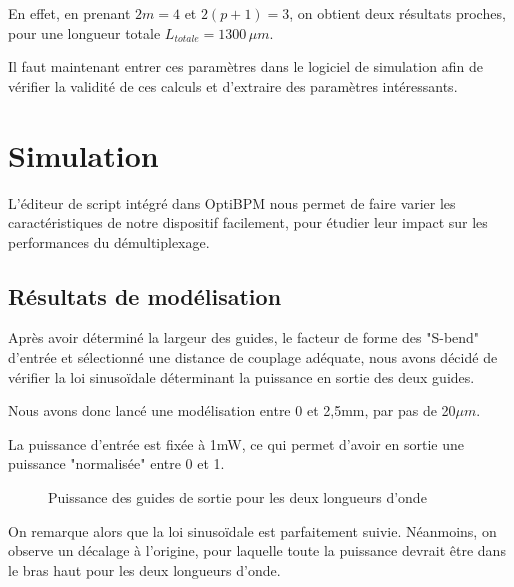 \documentclass[a4paper,11pt]{report}
\begin{document}
En effet, en prenant $2m=4$ et $2(p+1)=3$, on obtient deux résultats proches, pour une longueur totale $L_{totale}=1300\,\mu m$.

Il faut maintenant entrer ces paramètres dans le logiciel de simulation afin de vérifier la validité de ces calculs et d'extraire des paramètres intéressants.
\chapter{Simulation}

L'éditeur de script intégré dans OptiBPM nous permet de faire varier les caractéristiques de notre dispositif facilement, pour étudier leur impact sur les performances du démultiplexage.


\section{Résultats de modélisation}
Après avoir déterminé la largeur des guides, le facteur de forme des "S-bend" d'entrée et sélectionné une distance de couplage adéquate, nous avons décidé de vérifier la loi sinusoïdale déterminant la puissance en sortie des deux guides.

Nous avons donc lancé une modélisation entre 0 et 2,5mm, par pas de 20$\mu m$.

La puissance d'entrée est fixée à 1mW, ce qui permet d'avoir en sortie une puissance "normalisée" entre 0 et 1.

\begin{figure}[h]
    \begin{center}
        \caption{Puissance des guides de sortie pour les deux longueurs d'onde}
        \label{big_graph}
    \end{center}
\end{figure}
On remarque alors que la loi sinusoïdale est parfaitement suivie. Néanmoins, on observe un décalage à l'origine, pour laquelle toute la puissance devrait être dans le bras haut pour les deux longueurs d'onde.
\end{document}
